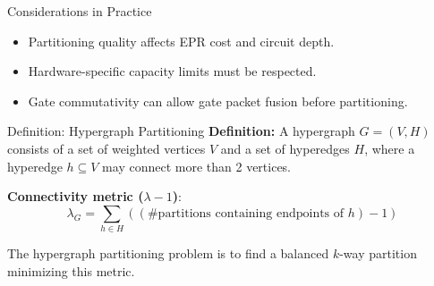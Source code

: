 \documentclass{beamer}
\begin{document}
	
	\begin{frame}{Considerations in Practice}
		\begin{itemize}
			\item Partitioning quality affects EPR cost and circuit depth.
			\item Hardware-specific capacity limits must be respected.
			\item Gate commutativity can allow gate packet fusion before partitioning.
		\end{itemize}
	\end{frame}
	
	\begin{frame}{Definition: Hypergraph Partitioning}
		\textbf{Definition:} A hypergraph $G = (V, H)$ consists of a set of weighted vertices $V$ and a set of hyperedges $H$, where a hyperedge $h \subseteq V$ may connect more than 2 vertices.
		\vspace{1em}
		
		\textbf{Connectivity metric (\(\lambda - 1\))}:
		\[
		\lambda_G = \sum_{h \in H} ((\#\text{partitions containing endpoints of } h) - 1)
		\]
		
		The hypergraph partitioning problem is to find a balanced $k$-way partition minimizing this metric.
	\end{frame}
	
\end{document}
